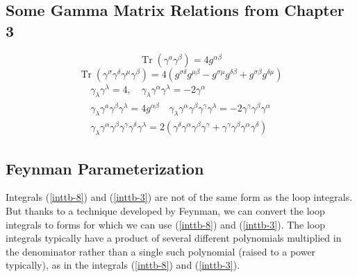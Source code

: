 \subsection{Some Gamma Matrix Relations from Chapter 3}
\begin{equation}\operatorname{Tr}\left(\gamma^{a} \gamma^{\beta}\right)=4 g^{\alpha \beta}\end{equation}
\begin{equation}\operatorname{Tr}\left(\gamma^{\sigma} \gamma^{\delta} \gamma^{\mu} \gamma^{\beta}\right)=4\left(g^{\sigma \delta} g^{\mu \beta}-g^{\sigma \mu} g^{\delta \beta}+g^{\sigma \beta} g^{\delta \mu}\right)\end{equation}
\begin{equation}\begin{array}{l}
\gamma_{\lambda} \gamma^{\lambda}=4, \quad \gamma_{\lambda} \gamma^{\alpha} \gamma^{\lambda}=-2 \gamma^{\alpha} \\
\gamma_{\lambda} \gamma^{a} \gamma^{\beta} \gamma^{\lambda}=4 g^{\alpha \beta} \quad \gamma_{\lambda} \gamma^{\alpha} \gamma^{\beta} \gamma^{\gamma} \gamma^{\lambda}=-2 \gamma^{\gamma} \gamma^{\beta} \gamma^{\alpha} \\
\gamma_{\lambda} \gamma^{\alpha} \gamma^{\beta} \gamma^{\gamma} \gamma^{\delta} \gamma^{\lambda}=2\left(\gamma^{\delta} \gamma^{\alpha} \gamma^{\beta} \gamma^{\gamma}+\gamma^{\gamma} \gamma^{\beta} \gamma^{\alpha} \gamma^{\delta}\right)
\end{array}\end{equation}

\subsection{Feynman Parameterization}
Integrals (\ref{inttb-8}) and (\ref{inttb-3}) are not of the same form as the loop integrals. But thanks to a technique developed by Feynman, we can convert the loop integrals to forms for which we can use (\ref{inttb-8}) and (\ref{inttb-3}). The loop integrals typically have a product of several different polynomials multiplied in the denominator rather than a single such polynomial (raised to a power typically), as in the integrals (\ref{inttb-8}) and (\ref{inttb-3}).

